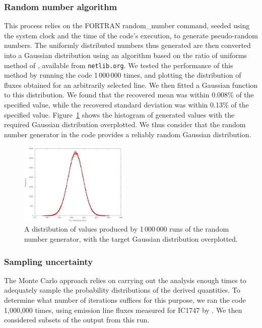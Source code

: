 \documentclass[useAMS,usenatbib]{mn2e}
\begin{document}
\subsubsection{Random number algorithm}

This process relies on the FORTRAN {\sc random\_number} command, seeded using the system clock and the time of the code's execution, to generate pseudo-random numbers.  The uniformly distributed numbers thus generated are then converted into a Gaussian distribution using an algorithm based on the ratio of uniforms method of \citet{Kinderman:1977:CGR:355744.355750}, available from \texttt{netlib.org}.  We tested the performance of this method by running the code 1\,000\,000 times, and plotting the distribution of fluxes obtained for an arbitrarily selected line.  We then fitted a Gaussian function to this distribution.  We found that the recovered mean was within 0.008\% of the specified value, while the recovered standard deviation was within 0.13\% of the specified value.  Figure~\ref{gaussiantest} shows the histogram of generated values with the required Gaussian distribution overplotted.  We thus consider that the random number generator in the code provides a reliably random Gaussian distribution.

\begin{figure}
\includegraphics[width=0.47\textwidth]{figures/gaussian_test.png}
\caption{A distribution of values produced by 1\,000\,000 runs of the random number generator, with the target Gaussian distribution overplotted.}
\label{gaussiantest}
\end{figure}

\subsubsection{Sampling uncertainty}

The Monte Carlo approach relies on carrying out the analysis enough times to adequately sample the probability distributions of the derived quantities.  To determine what number of iterations suffices for this purpose, we ran the code 1,000,000 times, using emission line fluxes measured for IC1747 by \citet{2005MNRAS.362..424W}.  We then considered subsets of the output from this run.
\end{document}
